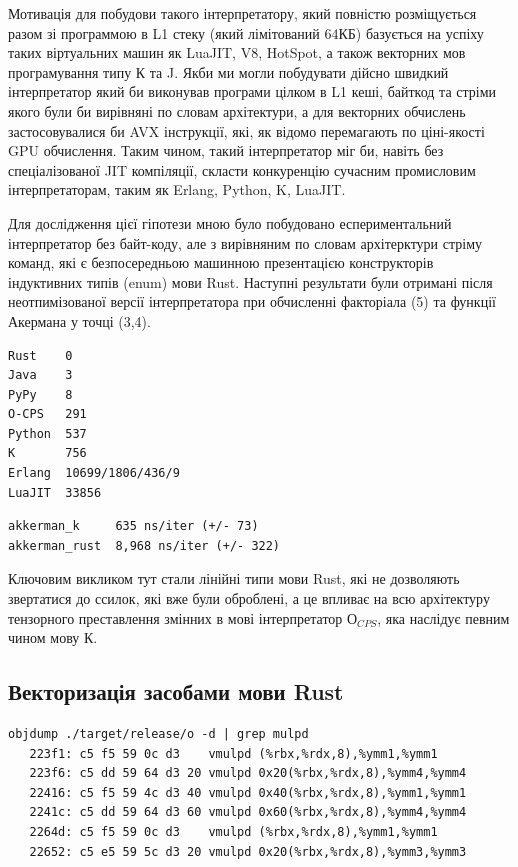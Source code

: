 Мотивація для побудови такого інтерпретатору, який повністю розміщується
разом зі программою в L1 стеку (який лімітований 64КБ) базується на успіху
таких віртуальних машин як LuaJIT, V8, HotSpot, а також векторних мов
програмування типу К та J. Якби ми могли побудувати дійсно швидкий інтерпретатор
який би виконував програми цілком в L1 кеші, байткод та стріми якого були би
вирівняні по словам архітектури, а для векторних обчислень застосовувалися би AVX інструкції,
які, як відомо перемагають по ціні-якості GPU обчислення. Таким чином, такий
інтерпретатор міг би, навіть без спеціалізованої JIT компіляції, скласти
конкуренцію сучасним промисловим інтерпретаторам, таким як Erlang, Python, K, LuaJIT.

Для дослідження цієї гіпотези мною було побудовано еспериментальний інтерпретатор
без байт-коду, але з вирівняним по словам архітерктури стріму команд, які є
безпосередньою машинною презентацією конструкторів індуктивних типів (enum) мови Rust.
Наступні результати були отримані після неотпимізованої версії інтерпретатора
при обчисленні факторіала (5) та функції Акермана у точці (3,4).

\begin{lstlisting}
Rust    0
Java    3
PyPy    8
O-CPS   291
Python  537
K       756
Erlang  10699/1806/436/9
LuaJIT  33856
\end{lstlisting}

\begin{lstlisting}
akkerman_k     635 ns/iter (+/- 73)
akkerman_rust  8,968 ns/iter (+/- 322)
\end{lstlisting}

Ключовим викликом тут стали лінійні типи мови Rust, які не дозволяють
звертатися до ссилок, які вже були оброблені, а це впливає на всю
архітектуру тензорного преставлення змінних в мові інтерпретатор $О_{CPS}$,
яка наслідує певним чином мову К.

\subsection{Векторизація засобами мови Rust}

\begin{lstlisting}
objdump ./target/release/o -d | grep mulpd
   223f1: c5 f5 59 0c d3    vmulpd (%rbx,%rdx,8),%ymm1,%ymm1
   223f6: c5 dd 59 64 d3 20 vmulpd 0x20(%rbx,%rdx,8),%ymm4,%ymm4
   22416: c5 f5 59 4c d3 40 vmulpd 0x40(%rbx,%rdx,8),%ymm1,%ymm1
   2241c: c5 dd 59 64 d3 60 vmulpd 0x60(%rbx,%rdx,8),%ymm4,%ymm4
   2264d: c5 f5 59 0c d3    vmulpd (%rbx,%rdx,8),%ymm1,%ymm1
   22652: c5 e5 59 5c d3 20 vmulpd 0x20(%rbx,%rdx,8),%ymm3,%ymm3
\end{lstlisting}

